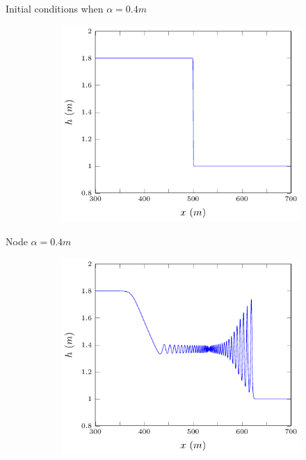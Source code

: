 \documentclass[pdf]{beamer}
\begin{document}
\begin{frame}{Initial conditions when $\alpha = 0.4m$}
	\begin{figure}
		\centering
		\begin{subfigure}{0.75\textwidth}
			\includegraphics[width=\textwidth]{../Pics/init/DBs9/1-figure0.pdf}
		\end{subfigure}%
	\end{figure}
\end{frame}

\begin{frame}{Node $\alpha = 0.4m$}
	\begin{figure}
		\begin{subfigure}{0.75\textwidth}
			\includegraphics[width=\textwidth]{../Pics/DBstruct/9.pdf}
		\end{subfigure}
	\end{figure}
\end{frame}
\end{document}
